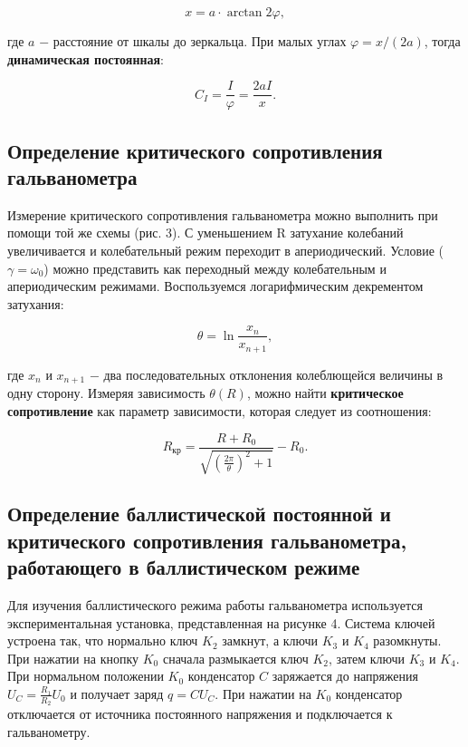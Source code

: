 \documentclass[a4paper,12pt]{article} %
\begin{document}
$$
x = a \cdot \arctan{2\varphi},
$$

\hfill \break где $a$ $-$ расстояние от шкалы до зеркальца. При малых углах $\varphi = x/(2a)$, тогда \textbf{динамическая постоянная}:

\begin{equation}\label{ linkname }
C_{I} = \frac{I}{\varphi} = \frac{2aI}{x}.
\end{equation}

\subsection{Определение критического сопротивления гальванометра}
\hfill \break Измерение критического сопротивления гальванометра можно выполнить при помощи той же схемы (рис. 3). С уменьшением R затухание колебаний увеличивается и колебательный режим переходит в апериодический. Условие ($\gamma = \omega_{0}$) можно представить как переходный между колебательным и апериодическим режимами. Воспользуемся логарифмическим декрементом затухания:

\begin{equation}\label{ linkname }
\theta = \ln{\frac{x_{n}}{x_{n+1}}},
\end{equation}

\hfill \break где $x_{n}$ и $x_{n+1}$ $-$ два последовательных отклонения колеблющейся величины в одну сторону. Измеряя зависимость $\theta (R)$, можно найти \textbf{критическое сопротивление} как параметр зависимости, которая следует из соотношения:

\begin{equation}\label{ linkname }
R_\text{кр} = \frac{R+R_{0}}{\sqrt{(\frac{2\pi}{\theta})^2+1}}-R_{0}.
\end{equation}

\subsection{Определение баллистической постоянной и критического сопротивления гальванометра, работающего в баллистическом режиме}
\hfill \break Для изучения баллистического режима работы гальванометра используется экспериментальная установка, представленная на рисунке 4. Система ключей устроена так, что нормально ключ $K_{2}$ замкнут, а ключи $K_{3}$ и $K_{4}$ разомкнуты. При нажатии на кнопку $K_{0}$ сначала размыкается ключ $K_{2}$, затем ключи $K_{3}$ и $K_{4}$. При нормальном положении $K_{0}$ конденсатор $C$ заряжается до напряжения $U_{C} = \frac{R_{1}}{R_{2}}U_{0}$ и получает заряд $q = CU_{C}$. При нажатии на $K_{0}$ конденсатор отключается от источника постоянного напряжения и подключается к гальванометру.
\end{document}
